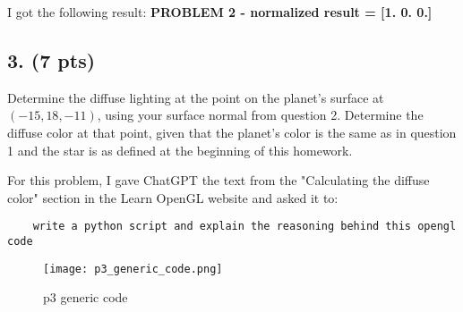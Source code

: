 \documentclass{article}
\begin{document}
I got the following result: \textbf{PROBLEM 2 - normalized result = [1. 0. 0.]}

\subsection*{3. (7 pts)}
Determine the diffuse lighting at the point on the planet’s surface at \((-15,18,-11)\), using your surface normal from question 2. Determine the diffuse color at that point, given that the planet’s color is the same as in question 1 and the star is as defined at the beginning of this homework.

For this problem, I gave ChatGPT the text from the "Calculating the diffuse color" section in the Learn OpenGL website and asked it to:
\begin{verbatim}
    write a python script and explain the reasoning behind this opengl code
\end{verbatim}
\begin{figure}[H]
    \centering
    \texttt{[image: p3\_generic\_code.png]}
    \caption{p3 generic code}
    \label{fig:p3_generic_code}
\end{figure}
\end{document}
